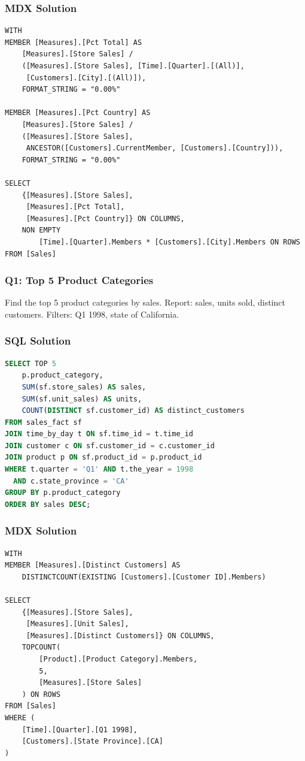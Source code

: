\subsubsection*{MDX Solution}
\begin{lstlisting}[language=MDX]
WITH
MEMBER [Measures].[Pct Total] AS
    [Measures].[Store Sales] /
    ([Measures].[Store Sales], [Time].[Quarter].[(All)],
     [Customers].[City].[(All)]),
    FORMAT_STRING = "0.00%"

MEMBER [Measures].[Pct Country] AS
    [Measures].[Store Sales] /
    ([Measures].[Store Sales],
     ANCESTOR([Customers].CurrentMember, [Customers].[Country])),
    FORMAT_STRING = "0.00%"

SELECT
    {[Measures].[Store Sales],
     [Measures].[Pct Total],
     [Measures].[Pct Country]} ON COLUMNS,
    NON EMPTY
        [Time].[Quarter].Members * [Customers].[City].Members ON ROWS
FROM [Sales]
\end{lstlisting}

\subsubsection{Q1: Top 5 Product Categories}
\label{subsec:ex-q1}

\begin{theorybox}[frametitle={Exercise}]
Find the top 5 product categories by sales. Report: sales, units sold, distinct customers. Filters: Q1 1998, state of California.
\end{theorybox}

\subsubsection*{SQL Solution}
\begin{lstlisting}[language=SQL]
SELECT TOP 5
    p.product_category,
    SUM(sf.store_sales) AS sales,
    SUM(sf.unit_sales) AS units,
    COUNT(DISTINCT sf.customer_id) AS distinct_customers
FROM sales_fact sf
JOIN time_by_day t ON sf.time_id = t.time_id
JOIN customer c ON sf.customer_id = c.customer_id
JOIN product p ON sf.product_id = p.product_id
WHERE t.quarter = 'Q1' AND t.the_year = 1998
  AND c.state_province = 'CA'
GROUP BY p.product_category
ORDER BY sales DESC;
\end{lstlisting}

\subsubsection*{MDX Solution}
\begin{lstlisting}[language=MDX]
WITH
MEMBER [Measures].[Distinct Customers] AS
    DISTINCTCOUNT(EXISTING [Customers].[Customer ID].Members)

SELECT
    {[Measures].[Store Sales],
     [Measures].[Unit Sales],
     [Measures].[Distinct Customers]} ON COLUMNS,
    TOPCOUNT(
        [Product].[Product Category].Members,
        5,
        [Measures].[Store Sales]
    ) ON ROWS
FROM [Sales]
WHERE (
    [Time].[Quarter].[Q1 1998],
    [Customers].[State Province].[CA]
)
\end{lstlisting}

